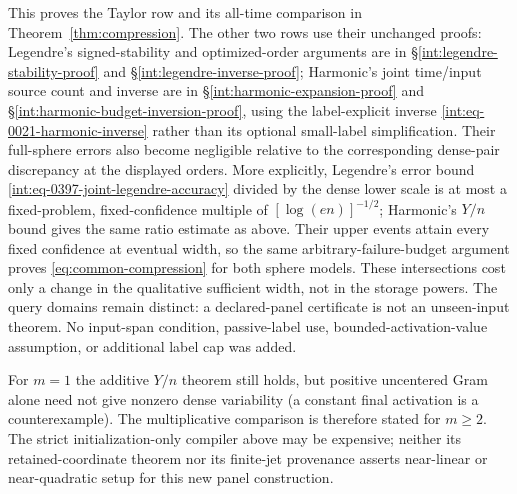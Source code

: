This proves the Taylor row and its all-time comparison in
Theorem~\ref{thm:compression}.  The other two rows use their unchanged
proofs: Legendre's signed-stability and optimized-order arguments are
in \S\ref{int:legendre-stability-proof} and
\S\ref{int:legendre-inverse-proof}; Harmonic's joint time/input
source count and inverse are in
\S\ref{int:harmonic-expansion-proof} and
\S\ref{int:harmonic-budget-inversion-proof}, using the label-explicit
inverse \eqref{int:eq-0021-harmonic-inverse} rather than its optional
small-label simplification.  Their full-sphere errors also become
negligible relative to the corresponding dense-pair discrepancy at
the displayed orders.  More explicitly, Legendre's error bound
\eqref{int:eq-0397-joint-legendre-accuracy} divided by the dense lower
scale is at most a fixed-problem, fixed-confidence multiple of
\([\log(en)]^{-1/2}\); Harmonic's \(Y/n\) bound gives the same
ratio estimate as above.  Their upper events attain every fixed
confidence at eventual width, so the same arbitrary-failure-budget
argument proves \eqref{eq:common-compression} for both sphere models.
These intersections cost only a
change in the qualitative sufficient width, not in the storage powers.
The query domains remain distinct: a declared-panel certificate is not
an unseen-input theorem.  No input-span condition, passive-label use,
bounded-activation-value assumption, or additional label cap was added.

For \(m=1\) the additive \(Y/n\) theorem still holds, but positive
uncentered Gram alone need not give nonzero dense variability (a
constant final activation is a counterexample).  The multiplicative
comparison is therefore stated for \(m\ge2\).  The strict
initialization-only compiler above may be expensive; neither its
retained-coordinate theorem nor its finite-jet provenance asserts
near-linear or near-quadratic setup for this new panel construction.

